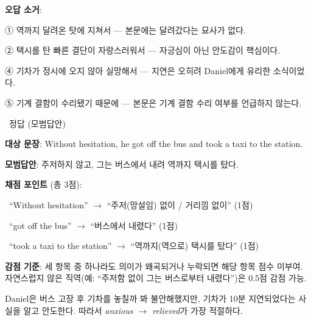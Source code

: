 \documentclass[11pt,a4paper]{article}
\newcommand{\qno}[1]{\par\vspace{10pt}\noindent{\sffamily\bfseries #1.}\ }
\newcommand{\instr}[1]{{\sffamily #1}\par\vspace{3pt}}
\begin{document}
\vspace{4pt}
\noindent\textbf{오답 소거}:
\begin{choices}
\item ① 역까지 달려온 탓에 지쳐서 — 본문에는 달려갔다는 묘사가 없다.
\item ② 택시를 탄 빠른 결단이 자랑스러워서 — 자긍심이 아닌 안도감이 핵심이다.
\item ④ 기차가 정시에 오지 않아 실망해서 — 지연은 오히려 Daniel에게 유리한 소식이었다.
\item ⑤ 기계 결함이 수리됐기 때문에 — 본문은 기계 결함 수리 여부를 언급하지 않는다.
\end{choices}

\vspace{10pt}

\qno{3}\instr{[서술형] 정답 (모범답안)}

\begin{pbox}
\textbf{대상 문장}: Without hesitation, he got off the bus and took a taxi to the station.

\vspace{6pt}
\textbf{모범답안}: 주저하지 않고, 그는 버스에서 내려 역까지 택시를 탔다.
\end{pbox}

\vspace{6pt}
\noindent\textbf{채점 포인트} (총 3점):
\begin{choices}
\item \textbullet\ ``Without hesitation'' $\rightarrow$ ``주저(망설임) 없이 / 거리낌 없이'' \hfill (1점)
\item \textbullet\ ``got off the bus'' $\rightarrow$ ``버스에서 내렸다'' \hfill (1점)
\item \textbullet\ ``took a taxi to the station'' $\rightarrow$ ``역까지(역으로) 택시를 탔다'' \hfill (1점)
\end{choices}

\vspace{4pt}
\noindent\textbf{감점 기준}: 세 항목 중 하나라도 의미가 왜곡되거나 누락되면 해당 항목 점수 미부여.
자연스럽지 않은 직역(예: ``주저함 없이 그는 버스로부터 내렸다'')은 0.5점 감점 가능.

\vspace{8pt}
\par Daniel은 버스 고장 후 기차를 놓칠까 봐 불안해했지만, 기차가 10분 지연되었다는 사실을 알고 안도한다. 따라서 \textit{anxious $\rightarrow$ relieved}가 가장 적절하다.
\end{document}
